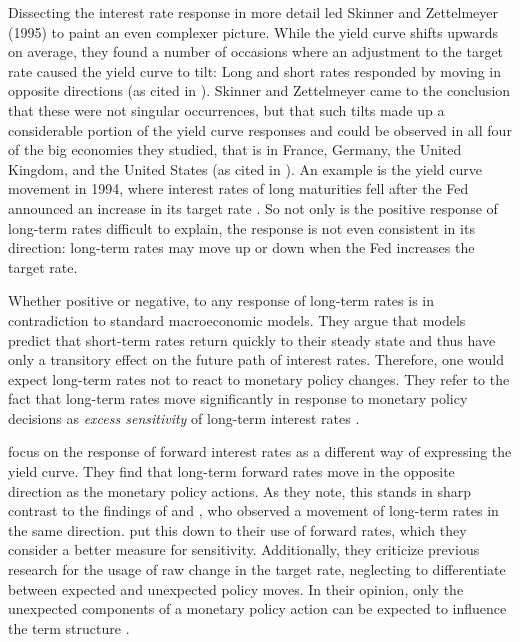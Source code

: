 \documentclass[11pt,a4paper,english,oneside]{book}
\numberwithin{equation}{chapter}
\begin{document}
Dissecting the interest rate response in more detail led Skinner and Zettelmeyer (1995) to paint an even complexer picture. While the yield curve shifts upwards on average, they found a number of occasions where an adjustment to the target rate caused the yield curve to tilt: Long and short rates responded by moving in opposite directions (as cited in \citealp[p. 1]{Ellingsen.2003}). Skinner and Zettelmeyer came to the conclusion that these were not singular occurrences, but that such tilts made up a considerable portion of the yield curve responses and could be observed in all four of the big economies they studied, that is in France, Germany, the United Kingdom, and the United States (as cited in \citealp[p. 1594]{Ellingsen.2001}). An example is the yield curve movement in 1994, where interest rates of long maturities fell after the Fed announced an increase in its target rate \citep[~p. 1594]{Ellingsen.2001}. So not only is the positive response of long-term rates difficult to explain, the response is not even consistent in its direction: long-term rates may move up or down when the Fed increases the target rate. 

Whether positive or negative, to \citet[p. 425]{Gurkaynak.2005} any response of long-term rates is in contradiction to standard macroeconomic models. They argue that models predict that short-term rates return quickly to their steady state and thus have only a transitory effect on the future path of interest rates. Therefore, one would expect long-term rates not to react to monetary policy changes. They refer to the fact that long-term rates move significantly in response to monetary policy decisions as \textit{excess sensitivity} of long-term interest rates \cite[p. 2]{Gurkaynak.2003}.

\citet[p. 426--427]{Gurkaynak.2005} focus on the response of forward interest rates as a different way of expressing the yield curve. They find that long-term forward rates move in the opposite direction as the monetary policy actions. As they note, this stands in sharp contrast to the findings of \cite{Cook.1989} and \cite{Romer.2000}, who observed a movement of long-term rates in the same direction. \citeauthor{Gurkaynak.2005} put this down to their use of forward rates, which they consider a better measure for sensitivity. %
Additionally, they criticize previous research for the usage of raw change in the target rate, neglecting to differentiate between expected and unexpected policy moves. In their opinion, only the unexpected components of a monetary policy action can be expected to influence the term structure \citep[p. 430--431]{Gurkaynak.2005}.
\end{document}
